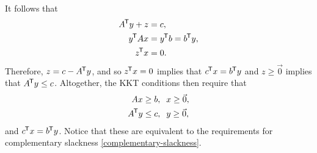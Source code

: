 \begin{exmp}
\begin{align*}
    \end{align*}
    It follows that
    \begin{align*}
        {A}^{\mkern-1.5mu\mathsf{T}}y + z &= c, \\
        {y}^{\mkern-1.5mu\mathsf{T}}Ax &= {y}^{\mkern-1.5mu\mathsf{T}}b = {b}^{\mkern-1.5mu\mathsf{T}}y, \\
        {z}^{\mkern-1.5mu\mathsf{T}}x &= 0.
    \end{align*}
    Therefore, $z = c - {A}^{\mkern-1.5mu\mathsf{T}}y$, and so ${z}^{\mkern-1.5mu\mathsf{T}}x = 0$ implies that ${c}^{\mkern-1.5mu\mathsf{T}}x = {b}^{\mkern-1.5mu\mathsf{T}}y$ and $z \geq \vec{0}$ implies that ${A}^{\mkern-1.5mu\mathsf{T}}y \leq c$. Altogether, the KKT conditions then require that
    \begin{align*}
        Ax &\geq b, \;\; x \geq \vec{0}, \\
        {A}^{\mkern-1.5mu\mathsf{T}}y &\leq c, \;\; y \geq \vec{0},
    \end{align*}
    and ${c}^{\mkern-1.5mu\mathsf{T}}x = {b}^{\mkern-1.5mu\mathsf{T}}y$. Notice that these are equivalent to the requirements for complementary slackness \ref{complementary-slackness}.
\end{exmp}

